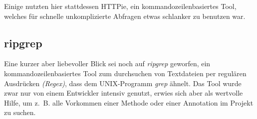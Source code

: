 \documentclass[a4paper, 11pt]{article}
\begin{document}
Einige nutzten hier stattdessen HTTPie, ein kommandozeilenbasiertes Tool,
welches für schnelle unkomplizierte Abfragen etwas schlanker zu benutzen war.

\subsection{ripgrep}

Eine kurzer aber liebevoller Blick sei noch auf \emph{ripgrep} geworfen, ein
kommandozeilenbasiertes Tool zum durchsuchen von Textdateien per regulären
Ausdrücken \emph{(Regex)}, dass dem UNIX-Programm \emph{grep} ähnelt. Das Tool
wurde zwar nur von einem Entwickler intensiv genutzt, erwies sich aber als
wertvolle Hilfe, um z.~B. alle Vorkommen einer Methode oder einer Annotation im
Projekt zu suchen. 
\end{document}
